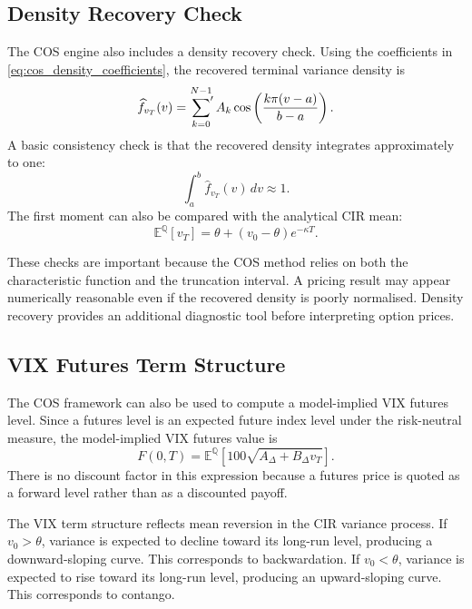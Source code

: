 \subsection{Density Recovery Check}

The COS engine also includes a density recovery check. Using the coefficients in \eqref{eq:cos_density_coefficients}, the recovered terminal variance density is
\begin{equation}
\widehat{f}_{v_T}(v)
=
\sideset{}{'}\sum_{k=0}^{N-1}
A_k
\cos\left(
\frac{k\pi(v-a)}{b-a}
\right).
\label{eq:cos_recovered_density}
\end{equation}
A basic consistency check is that the recovered density integrates approximately to one:
\begin{equation}
\int_a^b
\widehat{f}_{v_T}(v)\,dv
\approx
1.
\end{equation}
The first moment can also be compared with the analytical CIR mean:
\begin{equation}
\mathbb{E}^{\mathbb{Q}}[v_T]
=
\theta+(v_0-\theta)e^{-\kappa T}.
\end{equation}

These checks are important because the COS method relies on both the characteristic function and the truncation interval. A pricing result may appear numerically reasonable even if the recovered density is poorly normalised. Density recovery provides an additional diagnostic tool before interpreting option prices.

\subsection{VIX Futures Term Structure}

The COS framework can also be used to compute a model-implied VIX futures level. Since a futures level is an expected future index level under the risk-neutral measure, the model-implied VIX futures value is
\begin{equation}
F(0,T)
=
\mathbb{E}^{\mathbb{Q}}
\left[
100\sqrt{A_\Delta+B_\Delta v_T}
\right].
\label{eq:vix_futures}
\end{equation}
There is no discount factor in this expression because a futures price is quoted as a forward level rather than as a discounted payoff.

The VIX term structure reflects mean reversion in the CIR variance process. If \(v_0>\theta\), variance is expected to decline toward its long-run level, producing a downward-sloping curve. This corresponds to backwardation. If \(v_0<\theta\), variance is expected to rise toward its long-run level, producing an upward-sloping curve. This corresponds to contango.

